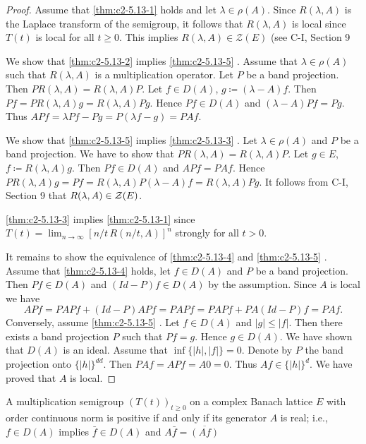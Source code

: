 \begin{proof}
Assume that \ref{thm:c2-5.13-1}   holds and let $\lambda \in \rho(A)$.
Since $R(\lambda,A)$ is the Laplace transform of the semigroup, it follows that $R(\lambda,A)$ is local since $T(t)$ is local for all $t \geq 0$.
This implies $R(\lambda,A) \in \mathcal{Z}(E)$ (see C-I, Section 9

We show that \ref{thm:c2-5.13-2}   implies \ref{thm:c2-5.13-5}  .
Assume that $\lambda \in \rho(A)$ such that $R(\lambda,A)$ is a multiplication operator.
Let $P$ be a band projection.
Then $PR(\lambda,A) = R(\lambda,A)P$.
Let $f \in D(A)$, $g \coloneqq (\lambda-A)f$.
Then $Pf = PR(\lambda,A)g = R(\lambda,A)Pg$.
Hence $Pf \in D(A)$ and $(\lambda-A)Pf = Pg$.
Thus $APf= \lambda Pf - Pg = P(\lambda f - g) = PAf$.

We show that \ref{thm:c2-5.13-5}   implies \ref{thm:c2-5.13-3}  .
Let $\lambda \in \rho(A)$ and $P$ be a band projection.
We have to show that $PR(\lambda,A) = R(\lambda,A)P$.
Let $g \in E$, $f \coloneqq R(\lambda,A)g$.
Then $Pf \in D(A)$ and $APf = PAf$.
Hence $PR(\lambda,A)g = Pf = R(\lambda,A)P(\lambda-A)f = R(\lambda,A)Pg$.
It follows from C-I, Section 9 
that $R(\lambda,A) \in \mathcal{Z}(E)$.

 \ref{thm:c2-5.13-3}   implies  \ref{thm:c2-5.13-1}   since $T(t) = \lim_{n \to \infty} [n/t\,R(n/t,A)]^{n}$ strongly for all $t > 0$.

It remains to show the equivalence of  \ref{thm:c2-5.13-4}   and  \ref{thm:c2-5.13-5}  .
Assume that  \ref{thm:c2-5.13-4}   holds, let $f \in D(A)$ and $P$ be a band projection.
Then $Pf \in D(A)$ and $(Id-P)f \in D(A)$ by the assumption.
Since $A$ is local we have 
\[
APf = PAPf + (Id-P)APf = PAPf = PAPf + PA(Id-P)f = PAf.
\]
Conversely, assume  \ref{thm:c2-5.13-5}  .
Let $f \in D(A)$ and $|g| \leq |f|$.
Then there exists a band projection $P$ such that $Pf = g$.
Hence $g \in D(A)$.
We have shown
that $D(A)$ is an ideal.
Assume that $\inf\{|h|,|f|\} = 0$.
Denote by $P$ the band projection onto $\{|h|\}^{dd}$.
Then $PAf = APf = A0 = 0$.
Thus $Af \in \{|h|\}^{d}$.
We have proved that $A$ is local.
\end{proof}


\begin{corollary}\label{cor:c2-5.14}
A multiplication semigroup $(T(t))_{t \geq 0}$ on a complex Banach lattice $E$ with order continuous norm is positive if and only if its generator $A$ is real; i.e., $f \in D(A)$ implies $\bar{f} \in D(A)$ and $A\bar{f} = \overline{(Af)}$
\end{corollary}

